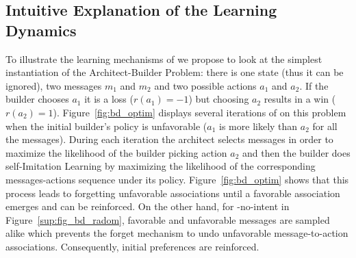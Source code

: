 \subsection{Intuitive Explanation of the Learning Dynamics}
\label{sup:sec_res_toy}
To illustrate the learning mechanisms of \abig we propose to look at the simplest instantiation of the Architect-Builder Problem: there is one state (thus it can be ignored), two messages $m_1$ and $m_2$ and two possible actions $a_1$ and $a_2$. If the builder chooses $a_1$ it is a loss ($r(a_1) = -1$) but choosing $a_2$ results in a win ($r(a_2) = 1$). Figure~\ref{fig:bd_optim} displays several iterations of \abig on this problem when the initial builder's policy is unfavorable ($a_1$ is more likely than $a_2$ for all the messages). During each iteration the architect selects messages in order to maximize the likelihood of the builder picking action $a_2$ and then the builder does self-Imitation Learning by maximizing the likelihood of the corresponding messages-actions sequence under its policy.  Figure~\ref{fig:bd_optim} shows that this process leads to forgetting unfavorable associations until a favorable association emerges and can be reinforced. On the other hand, for \abig-no-intent in Figure~\ref{sup:fig_bd_radom}, favorable and unfavorable messages are sampled alike which prevents the forget mechanism to undo unfavorable message-to-action associations. Consequently, initial preferences are reinforced.  
%

